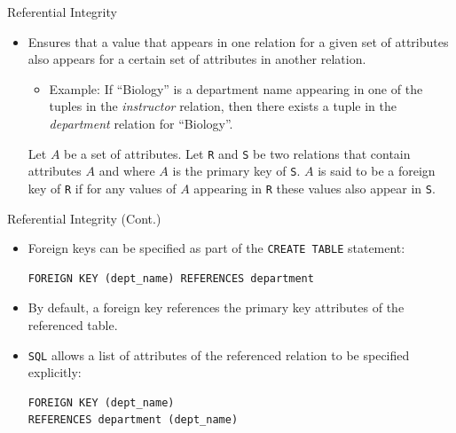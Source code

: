 \documentclass[aspectratio=169]{beamer}
\begin{document}
\begin{frame}{Referential Integrity}
    \begin{itemize}
        \item Ensures that a value that appears in one relation for a given set of attributes also appears for a certain set of attributes in another relation.
        \begin{itemize}
            \item Example: If ``Biology'' is a department name appearing in one of the tuples in the \textit{instructor} relation, then there exists a tuple in the \textit{department} relation for ``Biology''.
        \end{itemize}
        Let $A$ be a set of attributes. Let \texttt{R} and \texttt{S} be two relations that contain attributes $A$ and where $A$ is the primary key of \texttt{S}.  $A$ is said to be a foreign key of \texttt{R} if for any values of $A$ appearing in \texttt{R} these values also appear in \texttt{S}.
    \end{itemize}
\end{frame}

\begin{frame}[fragile]{Referential Integrity (Cont.)}
    \begin{itemize}
        \item Foreign keys can be specified as part of the \texttt{CREATE TABLE} statement:
            \begin{verbatim}
FOREIGN KEY (dept_name) REFERENCES department 
            \end{verbatim}
        \item By default, a foreign key references the primary key attributes of the referenced table.
        \item \texttt{SQL} allows a list of attributes of the referenced relation to be specified explicitly:
            \begin{verbatim}
FOREIGN KEY (dept_name) 
REFERENCES department (dept_name)
            \end{verbatim}
    \end{itemize}
\end{frame}
\end{document}
